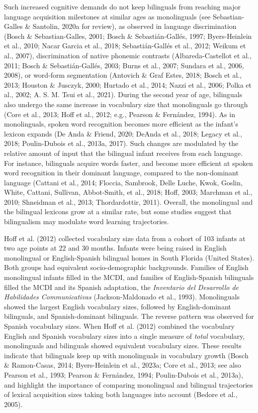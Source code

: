\documentclass[
  12pt,
  b5paperpaper,
  twoside]{scrreprt}
\begin{document}
Such increased cognitive demands do not keep bilinguals from reaching
major language acquisition milestones at similar ages as monolinguals
(see Sebastian-Galles \& Santolin, 2020a for review), as observed in
language discrimination (Bosch \& Sebastian-Galles, 2001; Bosch \&
Sebastián-Gallés, 1997; Byers-Heinlein et al., 2010; Nacar Garcia et
al., 2018; Sebastián-Gallés et al., 2012; Weikum et al., 2007),
discrimination of native phonemic contrasts (Albareda-Castellot et al.,
2011; Bosch \& Sebastián-Gallés, 2003; Burns et al., 2007; Sundara et
al., 2006, 2008), or word-form segmentation (Antovich \& Graf Estes,
2018; Bosch et al., 2013; Houston \& Jusczyk, 2000; Hurtado et al.,
2014; Nazzi et al., 2006; Polka et al., 2002; A. S. M. Tsui et al.,
2021). During the second year of age, bilinguals also undergo the same
increase in vocabulary size that monolinguals go through (Core et al.,
2013; Hoff et al., 2012; e.g., Pearson \& Fernández, 1994). As in
monolinguals, spoken word recognition becomes more efficient as the
infant's lexicon expands (De Anda \& Friend, 2020; DeAnda et al., 2018;
Legacy et al., 2018; Poulin-Dubois et al., 2013a, 2017). Such changes
are modulated by the relative amount of input that the bilingual infant
receives from each language. For instance, bilinguals acquire words
faster, and become more efficient at spoken word recognition in their
dominant language, compared to the non-dominant language (Cattani et
al., 2014; Floccia, Sambrook, Delle Luche, Kwok, Goslin, White, Cattani,
Sullivan, Abbot‐Smith, et al., 2018; Hoff, 2003; Marchman et al., 2010;
Shneidman et al., 2013; Thordardottir, 2011). Overall, the monolingual
and the bilingual lexicons grow at a similar rate, but some studies
suggest that bilingualism may modulate word learning trajectories.

Hoff et al. (2012) collected vocabulary size data from a cohort of 103
infants at two age points at 22 and 30 months. Infants were being raised
in English monolingual or English-Spanish bilingual homes in South
Florida (United States). Both groups had equivalent socio-demographic
backgrounds. Families of English monolingual infants filled in the MCDI,
and families of English-Spanish bilinguals filled the MCDI and its
Spanish adaptation, the \emph{Inventario del Desarrollo de Habilidades
Communicativas} (Jackson-Maldonado et al., 1993). Monolinguals showed
the largest English vocabulary sizes, followed by English-dominant
bilinguals, and Spanish-dominant bilinguals. The reverse pattern was
observed for Spanish vocabulary sizes. When Hoff et al. (2012) combined
the vocabulary English and Spanish vocabulary sizes into a single
measure of \emph{total} vocabulary, monolinguals and bilinguals showed
equivalent vocabulary sizes. These results indicate that bilinguals keep
up with monolinguals in vocabulary growth (Bosch \& Ramon-Casas, 2014;
Byers-Heinlein et al., 2023a; Core et al., 2013; see also Pearson et
al., 1993; Pearson \& Fernández, 1994; Poulin-Dubois et al., 2013a), and
highlight the importance of comparing monolingual and bilingual
trajectories of lexical acquisition sizes taking both languages into
account (Bedore et al., 2005).
\end{document}
